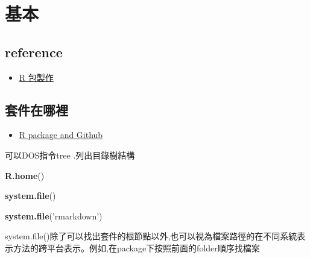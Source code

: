 \documentclass[]{book}
\newenvironment{Shaded}{\begin{snugshade}}{\end{snugshade}}
\newcommand{\KeywordTok}[1]{\textcolor[rgb]{0.13,0.29,0.53}{\textbf{#1}}}
\newcommand{\StringTok}[1]{\textcolor[rgb]{0.31,0.60,0.02}{#1}}
\newcommand{\NormalTok}[1]{#1}
\providecommand{\tightlist}{%
  \setlength{\itemsep}{0pt}\setlength{\parskip}{0pt}}
\theoremstyle{definition}
\theoremstyle{definition}
\theoremstyle{definition}
\theoremstyle{remark}
\begin{document}
\section{基本}

\subsection{reference}\label{reference}

\begin{itemize}
\tightlist
\item
  \href{https://yulongniu.bionutshell.org/blog/2012/05/30/r-package-and-roxygen2/}{R
  包製作}
\end{itemize}

\subsection{套件在哪裡}

\begin{itemize}
\tightlist
\item
  \href{http://r-pkgs.had.co.nz/git.html}{R package and Github}
\end{itemize}

可以DOS指令tree .列出目錄樹結構

\begin{Shaded}
\begin{Highlighting}[]
\KeywordTok{R.home}\NormalTok{()}
\end{Highlighting}
\end{Shaded}

\begin{Shaded}
\begin{Highlighting}[]
\KeywordTok{system.file}\NormalTok{()}
\end{Highlighting}
\end{Shaded}

\begin{Shaded}
\begin{Highlighting}[]
\KeywordTok{system.file}\NormalTok{(}\StringTok{'rmarkdown'}\NormalTok{)}
\end{Highlighting}
\end{Shaded}

system.file()除了可以找出套件的根節點以外,也可以視為檔案路徑的在不同系統表示方法的跨平台表示。例如,在package下按照前面的folder順序找檔案
\end{document}

